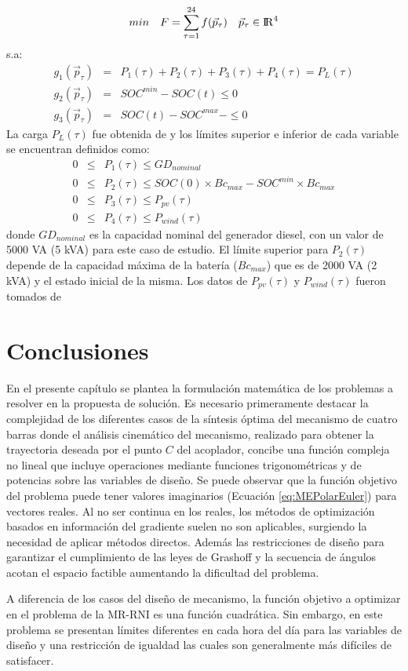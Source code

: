 \begin{equation}\label{eq:MR-FO3}
 min\quad  F=
 \sum_{\tau=1}^{24}f(\vec{p}_\tau) \quad \vec{p}_\tau \in {\rm I\!R}^{4}
 \end{equation}
 s.a:
\begin{eqnarray}\label{eq:Restricciones MR}
g_1(\vec{p}_\tau)&=&P_1(\tau)+P_2(\tau)+P_3(\tau)+P_4(\tau)=P_L(\tau)\\
g_2(\vec{p}_\tau)&=&SOC^{min}-SOC(t)\leq 0 \\
g_3(\vec{p}_\tau)&=&SOC(t)-SOC^{max}-\leq 0 
\end{eqnarray}
La carga $P_L(\tau)$ fue obtenida de \cite{tazvinga2014energy} y los límites superior e inferior de cada variable se encuentran definidos como:
\begin{eqnarray}\label{eq:Restricciones MR3}
0  & \leq & P_1(\tau)   \leq  GD_{nominal} \\
0  & \leq & P_2(\tau)   \leq  SOC(0) \times Bc_{max}-  SOC^{min} \times  Bc_{max}\\
0  & \leq & P_3(\tau)   \leq  P_{pv}( \tau) \\
0  & \leq & P_4(\tau)   \leq  P_{wind}(\tau )  \label{eq:ultima restriccion MR}
\end{eqnarray}
donde $GD_{nominal}$ es la capacidad nominal del generador diesel, con un valor de 5000 VA (5 kVA) para este caso de estudio. El límite superior para $ P_2(\tau)$ depende de la capacidad máxima de la batería ($Bc_{max}$) que es de 2000 VA (2 kVA) y el estado inicial de la misma. Los datos de $ P_{pv}( \tau)$ y $ P_{wind}(\tau )$  fueron tomados de \cite{Ramabhotla_Economic_dispatch}

\section{Conclusiones}
En el presente capítulo se plantea la formulación matemática de los problemas a resolver en la propuesta de solución. Es necesario primeramente destacar la complejidad de los diferentes casos de la síntesis óptima del mecanismo de cuatro barras donde el análisis cinemático del mecanismo, realizado para obtener la trayectoria deseada por el punto $C$ del acoplador, concibe una función compleja no lineal que incluye operaciones mediante funciones trigonométricas y de potencias sobre las variables de diseño. Se puede observar que la función objetivo del problema puede tener valores imaginarios (Ecuación \ref{eq:MEPolarEuler}) para vectores reales. Al no ser continua en los reales, los métodos de optimización basados en información del gradiente suelen no son aplicables, surgiendo la necesidad de aplicar métodos directos. Además las restricciones de diseño para garantizar el cumplimiento de las leyes de Grashoff y la secuencia de ángulos acotan el espacio factible aumentando la dificultad del problema. 

A diferencia de los casos del diseño de mecanismo, la función objetivo a optimizar en el problema de la MR-RNI es una función cuadrática. Sin embargo, en este problema se presentan límites diferentes en cada hora del día para las variables de diseño y una restricción de igualdad las cuales son generalmente más difíciles de satisfacer. 